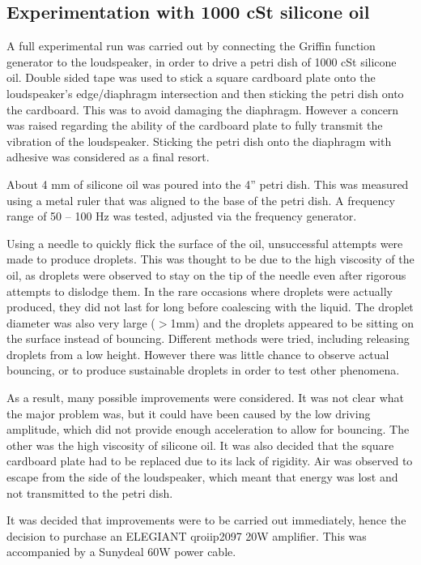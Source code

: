 \subsection{Experimentation with 1000 cSt silicone oil}
A full experimental run  was carried out by connecting the Griffin function generator to the loudspeaker, in order to drive a petri dish of 1000 cSt silicone oil. Double sided tape was used to stick a square cardboard plate onto the loudspeaker's edge/diaphragm intersection and then sticking the petri dish onto the cardboard. This was to avoid damaging the diaphragm. However a concern was raised regarding the ability of the cardboard plate to fully transmit the vibration of the loudspeaker. Sticking the petri dish onto the diaphragm with adhesive was considered as a final resort.

About 4 mm of silicone oil was poured into the 4'' petri dish. This was measured using a metal ruler that was aligned to the base of the petri dish. A frequency range of 50 -- 100 Hz was tested, adjusted via the frequency generator.

Using a needle to quickly flick the surface of the oil, unsuccessful attempts were made to produce droplets. This was thought to be due to the high viscosity of the oil, as droplets were observed to stay on the tip of the needle even after rigorous attempts to dislodge them. In the rare occasions where droplets were actually produced, they did not last for long before coalescing with the liquid. The droplet diameter was also very large ($>$1mm) and the droplets appeared to be sitting on the surface instead of bouncing. Different methods were tried, including releasing droplets from a low height. However there was little chance to observe actual bouncing, or to produce sustainable droplets in order to test other phenomena.

As a result,  many possible improvements were considered. It was not clear what the major problem was, but it  could have been caused by the low driving amplitude, which did not provide enough acceleration to allow for bouncing. The other was the high viscosity of silicone oil. It was also decided that the square cardboard plate had to be replaced due to its lack of rigidity. Air was observed to escape from the side of the loudspeaker, which meant that energy was lost and not transmitted to the petri dish. 

It was decided that improvements were to be carried out immediately, hence the decision to purchase an ELEGIANT qroiip2097 20W amplifier. This was accompanied by a Sunydeal 60W power cable.

